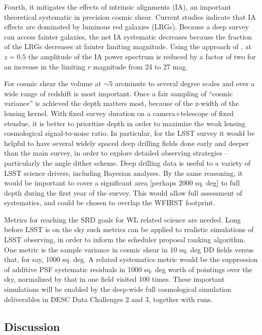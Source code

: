 Fourth, it mitigates the effects of intrinsic alignments (IA), an important
theoretical systematic in precision cosmic shear.  Current studies
\citep{Heymans2013} indicate that IA effects are dominated by luminous red
galaxies (LRGs).  Because a deep survey can access fainter galaxies, the net IA
systematic decreases because the fraction of the LRGs decreases at fainter
limiting magnitude.  Using the approach of \citet{Joachimi2011}, at $z = 0.5$
the amplitude of the IA power spectrum is reduced by a factor of two for an
increase in the limiting $r$ magnitude from 24 to 27 mag.

For cosmic shear the volume at $\sim 5$ arcminute to several degree scales and
over a wide range of redshift is most important.  Once a fair sampling of
“cosmic variance” is achieved the depth matters most, because of the z-width of
the lensing kernel.  With fixed survey duration on a camera+telescope of fixed
etendue, it is better to prioritize depth in order to maximize the weak lensing
cosmological signal-to-noise ratio.  In particular, for the LSST survey it would
be helpful to have several widely spaced deep drilling fields done early and
deeper than the main survey, in order to explore detailed observing strategies --
particularly the angle dither scheme.  Deep drilling data is useful to a variety
of LSST science drivers, including Bayesian analyses.  By the same reasoning, it
would be important to cover a significant area [perhaps 2000 sq. deg] to full
depth during the first year of the survey.  This would allow full assessment of
systematics, and could be chosen to overlap the WFIRST footprint.

Metrics for reaching the SRD goals for WL related science are needed. Long
before LSST is on the sky such metrics can be applied to realistic simulations
of LSST observing, in order to inform the scheduler proposal ranking algorithm.
One metric is the sample variance in cosmic shear in 10 sq. deg DD fields versus
that, for say, 1000 sq. deg.  A related systematics metric would be the
suppression of additive PSF systematic residuals in 1000 sq. deg worth of
pointings over the sky, normalized by that in one field visited 100 times. These
important simulations will be enabled by the deep-wide full cosmological
simulation deliverables in DESC Data Challenges 2 and 3, together with \OpSim
runs.


\subsection{Discussion}

